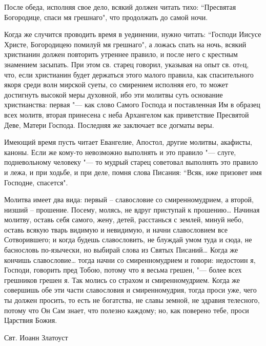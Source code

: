 После обеда, исполняя свое дело, всякий должен читать тихо: “Пресвятая Богородице, спаси мя грешнаго", что продолжать до самой ночи. 

Когда же случится проводить время в уединении, нужно читать: “Господи Иисусе Христе, Богородицею помилуй мя грешнаго", а ложась спать на ночь, всякий христианин должен повторить утреннее правило, и после него с крестным знамением засыпать. При этом св. старец говорил, указывая на опыт св. отeц, что, если христианин будет держаться этого малого правила, как спасительного якоря среди волн мирской суеты, со смирением исполняя его, то может достигнуть высокой меры духовной, ибо эти молитвы суть  основание христианства: первая "--- как слово Самого Господа и поставленная Им в образец всех молитв, вторая принесена с неба Архангелом как приветствие Пресвятой Деве, Матери Господа. Последняя же заключает все догматы веры. 

Имеющий время пусть читает Евангелие, Апостол, другие молитвы, акафисты, каноны. Если же кому-то невозможно выполнять и это правило "--- слуге, подневольному человеку "--- то мудрый старец советовал выполнять это правило и лежа, и при ходьбе, и при деле, помня слова Писания: “Всяк, иже призовет имя Господне, спасется". 




\mychapterending

 





Молитва имеет два вида: первый – славословие со смиренномудрием, а второй, низший – прошение. Посему, молясь, не вдруг приступай к прошению… Начиная молитву, оставь себя самого, жену, детей, расстанься с землей, минуй небо, оставь всякую тварь видимую и невидимую, и начни славословием все Сотворившего; и когда будешь славословить, не блуждай умом туда и сюда, не баснословь по-язычески, но выбирай слова из Святых Писаний… Когда же кончишь славословие… тогда начни со смиренномудрием и говори: недостоин я, Господи, говорить пред Тобою, потому что я весьма грешен, "--- более всех грешников грешен я. Так молись со страхом и смиренномудрием. Когда же совершишь обе эти части славословия и смиренномудрия, тогда проси уже, чего ты должен просить, то есть не богатства, не славы земной, не здравия телесного, потому что Он Сам знает, что полезно каждому; но, как поверено тебе, проси Царствия Божия.

Свт. Иоанн Златоуст

